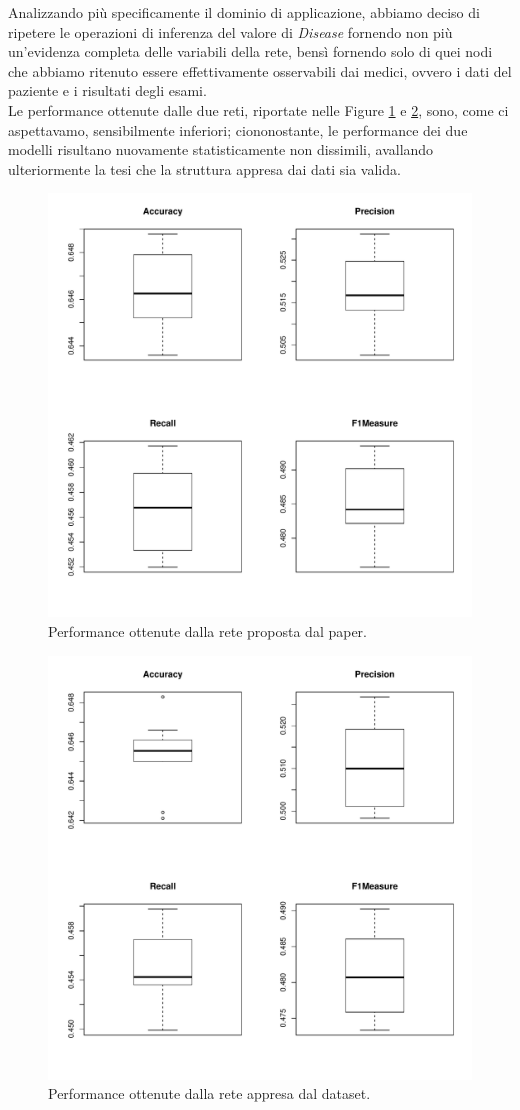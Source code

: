 Analizzando più specificamente il dominio di applicazione, abbiamo deciso di ripetere le operazioni di inferenza del valore di \textit{Disease} fornendo non più un'evidenza completa delle variabili della rete, bensì fornendo solo di quei nodi che abbiamo ritenuto essere effettivamente osservabili dai medici, ovvero i dati del paziente e i risultati degli esami.\\
Le performance ottenute dalle due reti, riportate nelle Figure \ref{fig:paperperformancehalf} e \ref{fig:inducedperformancehalf}, sono, come ci aspettavamo, sensibilmente inferiori; ciononostante, le performance dei due modelli risultano nuovamente statisticamente non dissimili, avallando ulteriormente la tesi che la struttura appresa dai dati sia valida.\\
\begin{figure}
	\centering
	\includegraphics[width=0.7\linewidth]{images/paper_performance_half}
	\caption{Performance ottenute dalla rete proposta dal paper.}
	\label{fig:paperperformancehalf}
\end{figure}
\begin{figure}
	\centering
	\includegraphics[width=0.7\linewidth]{images/induced_performance_half}
	\caption{Performance ottenute dalla rete appresa dal dataset.}
	\label{fig:inducedperformancehalf}
\end{figure}


